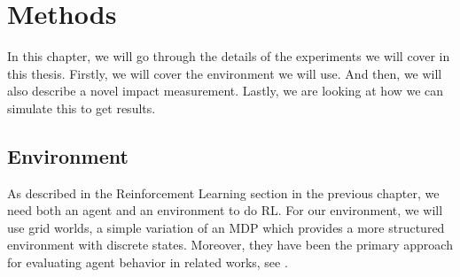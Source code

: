 \documentclass[12pt,A4]{report}
\theoremstyle{definition}
\begin{document}







\chapter{Methods}
In this chapter, we will go through the details of the experiments we will cover in this thesis. Firstly, we will cover the environment we will use. And then, we will also describe a novel impact measurement. Lastly, we are looking at how we can simulate this to get results.

\section{Environment}
As described in the Reinforcement Learning section in the previous chapter, we need both an agent and an environment to do RL. For our environment, we will use grid worlds, a simple variation of an MDP which provides a more structured environment with discrete states. Moreover, they have been the primary approach for evaluating agent behavior in related works, see \citet{Turner20}.
\end{document}
